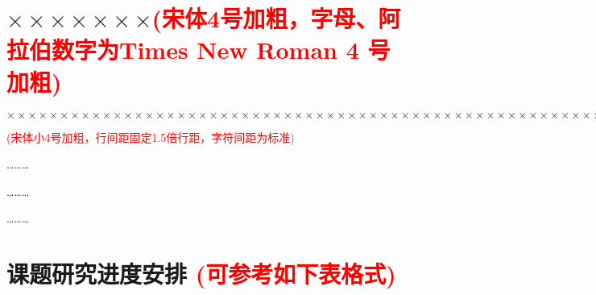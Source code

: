 \documentclass[11pt,a4paper]{article}
\newcommand{\xiaosihao}{\fontsize{12pt}{24pt}\selectfont}
\newcommand{\wuhao}{\fontsize{10.5pt}{18pt}\selectfont}
\newcommand\seccontent{
	\xiaosihao %
    \setlength{\parindent}{2em} %
    \setlength{\parskip}{0pt}
    }
\theoremstyle{definition}
\numberwithin{equation}{section}
\begin{document}
    	\section{$\times\times\times\times\times\times\times${\wuhao  \textcolor{red}{(宋体4号加粗，字母、阿拉伯数字为Times New Roman 4 号 加粗)}}}	\seccontent  
    $ \times\times\times\times\times\times\times\times\times\times\times\times\times\times\times\times\times\times\times\times\times\times\times\times\times\times\times\times\times\times\times\times\times\times\times\times\times\times\times\times\times\times\times\times\times\times\times\times\times\times\times\times\times\times\times\times\times\times\times\times\times\times\times\times\times\times\times\times\times\times\times\times\times\times\times\times\times\times\times\times\times\times\times\times\times\times\times\times\times\times\times\times\times\times\times\times\times\times\times\times\times\times\times\times\times\times\times\times\times\times\times\times\times\times\times\times\times\times\times\times\times\times\times\times\times\times\times\times\times\times\times\times\times\times\times\times\times\times\times\times\times\times\times\times\times\times\times\times\times\times\times\times\times\times\times\times\times\times\times\times\times\times\times\times\times\times\times\times\times\times\times\times\times\times\times\times\times\times\times\times\times\times\times\times\times\times\times $
    
    {\wuhao  \textcolor{red}{(宋体小4号加粗，行间距固定1.5倍行距，字符间距为标准)}}
    
    \hspace{15em} \ldots\ldots\ldots
    
    \hspace{15em} \ldots\ldots\ldots
    
    \hspace{15em} \ldots\ldots\ldots
 
 
 
 
 
 
 
 
 
 
    \section{课题研究进度安排 {\wuhao  \textcolor{red}{(可参考如下表格式)}}}
    
\end{document}
